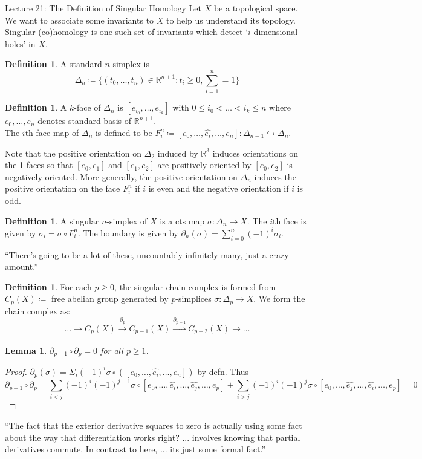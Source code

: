 \documentclass[10pt]{article}
\theoremstyle{plain}
\newtheorem{lemma}[thm]{Lemma}
\theoremstyle{definition}
\newtheorem{defn}[thm]{Definition} %
\newcommand{\Real}{\mathbb{R}}
\newcommand{\sumfromto}[2]{\sum\limits_{#1}^{#2}}
\begin{document}
\begin{section}{Lecture 21: The Definition of Singular Homology}
Let $X$ be a topological space. We want to associate some invariants to $X$ to help us understand its topology. Singular (co)homology is one such set of invariants which detect `$i$-dimensional holes' in $X$. 

\begin{defn}
    A standard $n$-simplex is 
    $$\Delta_n \coloneqq \{ (t_0,\ldots,t_n)\in \Real^{n+1} : t_i \geq 0, \sumfromto{i=1}{n} = 1\}$$
\end{defn}
\begin{defn}
    A $k$-face of $\Delta_n$ is $[e_{i_0},\ldots,e_{i_k}]$ with $0\leq i_0 < \ldots < i_k  \leq n$ where $e_0,\ldots,e_n$ denotes standard basis of $\Real^{n+1}$.\\
    The $i$th face map of $\Delta_n$ is defined to be $F_i^n \coloneqq [e_0,\ldots,\hat{e_i},\ldots,e_n] : \Delta_{n-1} \hookrightarrow \Delta_n$.
\end{defn}
Note that the positive orientation on $\Delta_2$ induced by $\Real^3$ induces orientations on the 1-faces so that $[e_0,e_1]$ and $[e_1,e_2]$ are positively oriented by $[e_0,e_2]$ is negatively oriented. More generally, the positive orientation on $\Delta_n$ induces the positive orientation on the face $F_i^n$ if $i$ is even and the negative orientation if $i$ is odd.

\begin{defn}
    A singular $n$-simplex of $X$ is a cts map $\sigma:\Delta_n \to X$. The $i$th face is given by $\sigma_i = \sigma \circ F^n_i$. The boundary is given by $\partial_n (\sigma) = \sumfromto{i=0}{n} (-1)^i \sigma_i$.
\end{defn}
``There's going to be a lot of these, uncountably infinitely many, just a crazy amount.''
\begin{defn}
    For each $p\geq 0$, the singular chain complex is formed from $C_p(X) \coloneqq$ free abelian group generated by $p$-simplices $\sigma :\Delta_p \to X$. We form the chain complex as:
    $$\ldots \to C_p(X) \xrightarrow[]{\partial_p} C_{p-1}(X) \xrightarrow[]{\partial_{p-1}} C_{p-2}(X) \to \ldots$$
\end{defn}

\begin{lemma}
    $\partial_{p-1} \circ \partial_p = 0$ for all $p \geq 1$.
\end{lemma}

\begin{proof}
    $\partial_p(\sigma) = \Sigma_i (-1)^i \sigma \circ ([e_0,\ldots,\hat{e_i},\ldots,e_n])$ by defn. Thus
    $$
    \partial_{p-1}\circ \partial_p = \sumfromto{i<j}{} (-1)^i (-1)^{j-1} \sigma \circ [e_0,\ldots,\hat{e_i},\ldots,\hat{e_j},\ldots,e_p] + \sumfromto{i>j}{} (-1)^i (-1)^{j} \sigma \circ [e_0,\ldots,\hat{e_j},\ldots,\hat{e_i},\ldots,e_p] =0
    $$
\end{proof}
\noindent
``The fact that the exterior derivative squares to zero is actually using some fact about the way that differentiation works right? ... involves knowing that partial derivatives commute. In contrast to here, ... its just some formal fact.''


\end{section}
\end{document}
